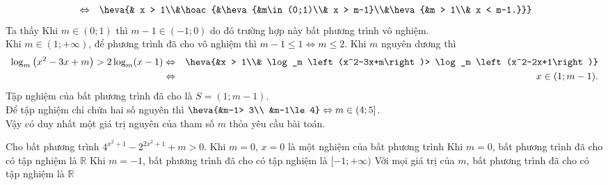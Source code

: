 \begin{ex}
{\begin{itemchoice}
\begin{eqnarray*}
				&\Leftrightarrow &\heva{& x > 1\\&\hoac{&\heva{&m\in  (0;1)\\& x > m-1}\\&\heva{&m > 1\\& x < m-1.}}}
			\end{eqnarray*}
			Ta  thấy
			Khi $m\in (0;1)$ thì $m-1\in(-1;0)$ do đó trường hợp này  bất phương trình vô nghiệm.\\
			Khi $m\in \left(1;+\infty \right)$, để phương trình đã cho vô nghiệm thì $m-1\le 1\Leftrightarrow m\le  2$.
			\itemch 
			 Khi $m$ nguyên dương thì
			\begin{eqnarray*}
				\log_m  \left(x^2-3x+m\right)> 2\log_m (x-1)&\Leftrightarrow &\heva{&x > 1\\& \log_m \left(x^2-3x+m\right)> \log_m \left(x^2-2x+1\right)}\\
				&\Leftrightarrow & x\in (1;m-1). 
			\end{eqnarray*}
			Tập nghiệm của bất  phương trình đã cho là $S=\left(1;m-1\right)$.\\
			Để tập  nghiệm chỉ chứa hai số nguyên thì $\heva{&m-1> 3\\
			&m-1\le 4}\Leftrightarrow m\in (4;5]$.\\ 
			Vậy có duy nhất một giá trị nguyên của tham số $m$  thỏa yêu cầu bài toán.
		\end{itemchoice}
	} 
\end{ex}

\begin{ex}%
	Cho bất phương  trình $4^{x^2+1}-2^{2x^2+1}+m > 0$.
	\choiceTF 
		{\True Khi $m=0$, $x=0$ là một nghiệm của bất  phương trình}
		{\True Khi $m=0$, bất phương trình đã cho  có tập nghiệm là $\mathbb{R}$}
		{Khi $m=-1$, bất phương trình đã cho  có tập nghiệm là $[-1;+\infty)$}
		{Với mọi giá trị của  $m$, bất phương trình đã cho có tập nghiệm là $\mathbb{R}$}
\end{ex}


